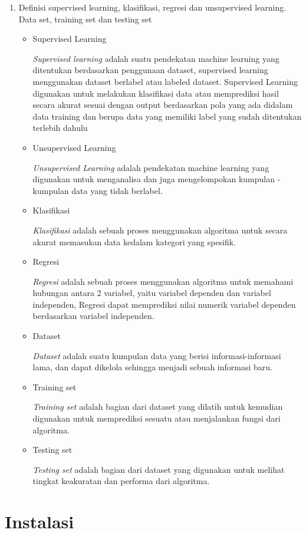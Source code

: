 \begin{enumerate}
	\item Definisi supervised learning, klasifikasi, regresi dan unsupervised learning. Data set, training set dan testing set
	\begin{itemize}
		\item Supervised Learning
		\par
		\textit{Supervised learning}
		adalah suatu pendekatan machine learning yang ditentukan berdasarkan penggunaan dataset, supervised learning menggunakan dataset berlabel atau labeled dataset. Supervised Learning digunakan untuk melakukan klasifikasi data atau memprediksi hasil secara akurat sesuai dengan output berdasarkan pola yang ada didalam data training dan berupa data yang memiliki label yang sudah ditentukan terlebih dahulu
		\item Unsupervised Learning
		\par
		\textit{Unsupervised Learning} adalah pendekatan machine learning yang digunakan untuk menganalisa dan juga mengelompokan kumpulan - kumpulan data yang tidak berlabel.
		\item Klasifikasi
		\par
		\textit{Klasifikasi} adalah sebuah proses menggunakan algoritma untuk secara akurat memasukan data kedalam kategori yang spesifik.
		\item Regresi
		\par
		\textit{Regresi} adalah sebuah proses menggunakan algoritma untuk memahami hubungan antara 2 variabel, yaitu variabel dependen dan variabel independen, Regresi dapat memprediksi nilai numerik variabel dependen berdasarkan variabel independen.
		\item Dataset
		\par
		\textit{Dataset} adalah suatu kumpulan data yang berisi informasi-informasi lama, dan dapat dikelola sehingga menjadi sebuah informasi baru.
		\item Training set
		\par
		\textit{Training set} adalah bagian dari dataset yang dilatih untuk kemudian digunakan untuk memprediksi sesuatu atau menjalankan fungsi dari algoritma.
		\item Testing set
		\par
		\textit{Testing set} adalah bagian dari dataset yang digunakan untuk melihat tingkat keakuratan dan performa dari algoritma.
	\end{itemize}

\end{enumerate}

\section{Instalasi}


